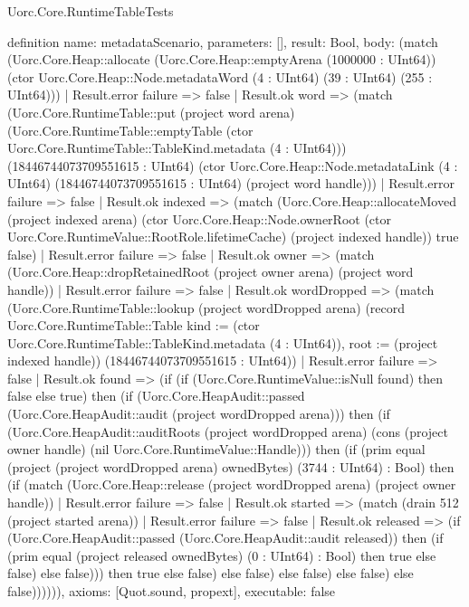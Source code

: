 \begin{lexlean}{Uorc.Core.RuntimeTableTests}
\begin{semanticmodule}
definition{
  name: metadataScenario,
  parameters: [],
  result: Bool,
  body: (match (Uorc.Core.Heap::allocate (Uorc.Core.Heap::emptyArena (1000000 : UInt64)) (ctor Uorc.Core.Heap::Node.metadataWord (4 : UInt64) (39 : UInt64) (255 : UInt64)))
    | Result.error failure => false
    | Result.ok word => (match (Uorc.Core.RuntimeTable::put (project word arena) (Uorc.Core.RuntimeTable::emptyTable (ctor Uorc.Core.RuntimeTable::TableKind.metadata (4 : UInt64))) (18446744073709551615 : UInt64) (ctor Uorc.Core.Heap::Node.metadataLink (4 : UInt64) (18446744073709551615 : UInt64) (project word handle)))
      | Result.error failure => false
      | Result.ok indexed => (match (Uorc.Core.Heap::allocateMoved (project indexed arena) (ctor Uorc.Core.Heap::Node.ownerRoot (ctor Uorc.Core.RuntimeValue::RootRole.lifetimeCache) (project indexed handle)) true false)
        | Result.error failure => false
        | Result.ok owner => (match (Uorc.Core.Heap::dropRetainedRoot (project owner arena) (project word handle))
          | Result.error failure => false
          | Result.ok wordDropped => (match (Uorc.Core.RuntimeTable::lookup (project wordDropped arena) (record Uorc.Core.RuntimeTable::Table {kind := (ctor Uorc.Core.RuntimeTable::TableKind.metadata (4 : UInt64)), root := (project indexed handle)}) (18446744073709551615 : UInt64))
            | Result.error failure => false
            | Result.ok found => (if (if (Uorc.Core.RuntimeValue::isNull found) then false else true) then (if (Uorc.Core.HeapAudit::passed (Uorc.Core.HeapAudit::audit (project wordDropped arena))) then (if (Uorc.Core.HeapAudit::auditRoots (project wordDropped arena) (cons (project owner handle) (nil Uorc.Core.RuntimeValue::Handle))) then (if (prim equal (project (project wordDropped arena) ownedBytes) (3744 : UInt64) : Bool) then (if (match (Uorc.Core.Heap::release (project wordDropped arena) (project owner handle))
              | Result.error failure => false
              | Result.ok started => (match (drain 512 (project started arena))
                | Result.error failure => false
                | Result.ok released => (if (Uorc.Core.HeapAudit::passed (Uorc.Core.HeapAudit::audit released)) then (if (prim equal (project released ownedBytes) (0 : UInt64) : Bool) then true else false) else false))) then true else false) else false) else false) else false) else false)))))),
  axioms: [Quot.sound, propext],
  executable: false
}


\end{semanticmodule}
\end{lexlean}
